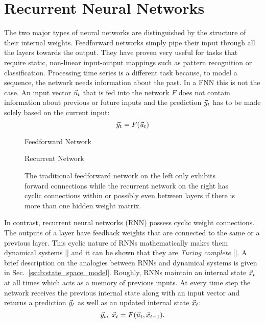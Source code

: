 \section{Recurrent Neural Networks}
\label{sec:recurrent_neural_networks}

The two major types of neural networks are distinguished by the structure of
their internal weights.  Feedforward networks simply pipe their input through
all the layers towards the output. They have proven very useful for tasks that
require static, non-linear input-output mappings such as pattern recognition or
classification.  Processing time series is a different task because, to model a
sequence, the network needs information about the past. In a FNN this is not
the case.  An input vector $\vec{u}_t$ that is fed into the network $F$ does not
contain information about previous or future inputs and the prediction $\vec{y}_t$
has to be made solely based on the current input:
\begin{equation}
  \vec{y}_t = F(\vec{u}_t)
\end{equation}

\begin{figure}
  \begin{minipage}[b]{.4\textwidth}
    \centering
    Feedforward Network
  \end{minipage}
  \hspace{.05\textwidth}
  \begin{minipage}[b]{.5\textwidth}
    \centering
    \RecurrentNet
    Recurrent Network
  \end{minipage}
  \caption{The traditional feedforward network on the left only exhibits
  forward connections while the recurrent network on the right has cyclic
  connections within or possibly even between layers if there is more than one
  hidden weight matrix.}
  \label{fig:fnn_rnn}
\end{figure}

In contrast, recurrent neural networks (RNN) possess cyclic weight connections.
The outputs of a layer have feedback weights that are connected to the same or
a previous layer.  This cyclic nature of RNNs mathematically makes them
dynamical systems [\cite{FUNAHASHI}] and it can be shown that they are
\emph{Turing complete} [\cite{siegelmann1991}]. A brief description on the analogies
between RNNs and dynamical systems is given in
Sec.~\ref{ssub:state_space_model}. Roughly, RNNs maintain an internal state
$\vec{x}_t$ at all times which acts as a memory of previous inputs. At every time
step the network receives the previous internal state along with an input
vector and returns a prediction $\vec{y}_t$ as well as an updated internal state
$\vec{x}_t$:
\begin{equation}
  \label{eq:recurrent_network_F}
  \vec{y}_t, \text{ } \vec{x}_t = F(\vec{u}_t, \vec{x}_{t-1}).
\end{equation}

